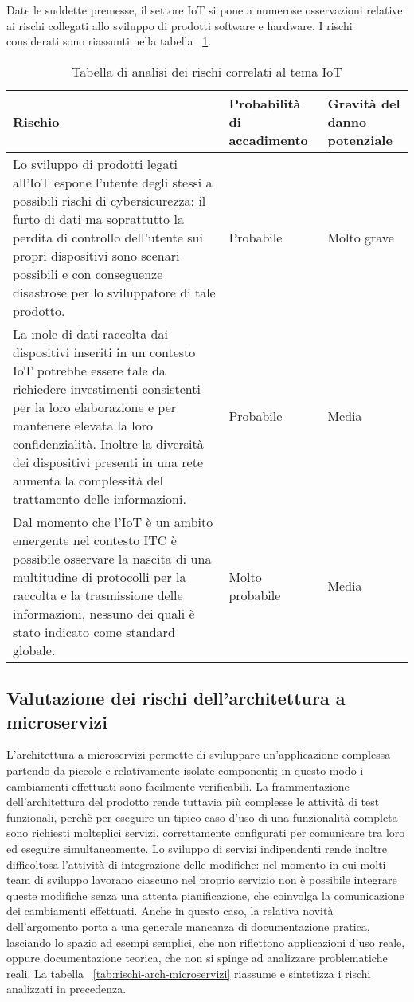 Date le suddette premesse, il settore IoT si pone a numerose osservazioni relative ai rischi collegati allo sviluppo di prodotti software e hardware. I rischi considerati sono riassunti nella tabella ~\ref{tab:rischi-iot}.
\begin{table}
\caption{Tabella di analisi dei rischi correlati al tema IoT}
\label{tab:rischi-iot}
\begin{tabularx}{\linewidth}{|p{7.5cm}|X|X|}
\hline
\textbf{Rischio} & \textbf{Probabilità di accadimento} & \textbf{Gravità del danno potenziale}\\
\hline
Lo sviluppo di prodotti legati all'IoT espone l'utente degli stessi a possibili rischi di cybersicurezza: il furto di dati ma soprattutto la perdita di controllo dell'utente sui propri dispositivi sono scenari possibili e con conseguenze disastrose per lo sviluppatore di tale prodotto. & Probabile & Molto grave \\
\hline
La mole di dati raccolta dai dispositivi inseriti in un contesto IoT potrebbe essere tale da richiedere investimenti consistenti per la loro elaborazione e per mantenere elevata la loro confidenzialità. Inoltre la diversità dei dispositivi presenti in una rete aumenta la complessità del trattamento delle informazioni. & Probabile & Media \\
\hline
Dal momento che l'IoT è un ambito emergente nel contesto ITC è possibile osservare la nascita di una multitudine di protocolli per la raccolta e la trasmissione delle informazioni, nessuno dei quali è stato indicato come standard globale. & Molto probabile & Media \\
\hline
\end{tabularx}
\end{table}


\subsection{Valutazione dei rischi dell'architettura a microservizi}

L'architettura a microservizi permette di sviluppare un'applicazione complessa partendo da piccole e relativamente isolate componenti;
in questo modo i cambiamenti effettuati sono facilmente verificabili.
La frammentazione dell'architettura del prodotto rende tuttavia più complesse le attività di test funzionali, perchè per eseguire un tipico caso d'uso di una funzionalità completa sono richiesti molteplici servizi, correttamente configurati per comunicare tra loro ed eseguire simultaneamente.
Lo sviluppo di servizi indipendenti rende inoltre difficoltosa l'attività di integrazione delle modifiche: nel momento in cui molti team di sviluppo lavorano ciascuno nel proprio servizio non è possibile integrare queste modifiche senza una attenta pianificazione, che coinvolga la comunicazione dei cambiamenti effettuati.
Anche in questo caso, la relativa novità dell'argomento porta a una generale mancanza di documentazione pratica, lasciando lo spazio ad esempi semplici, che non riflettono applicazioni d'uso reale, oppure documentazione teorica, che non si spinge ad analizzare problematiche reali.
La tabella ~\ref{tab:rischi-arch-microservizi} riassume e sintetizza i rischi analizzati in precedenza.


